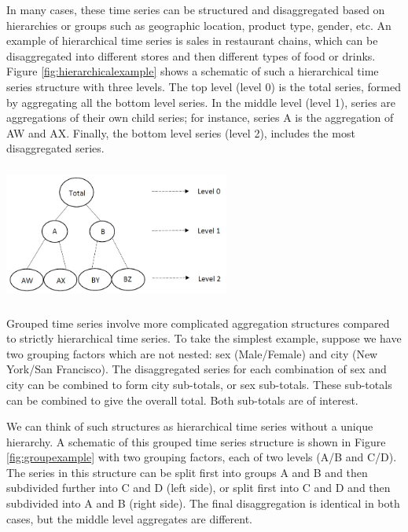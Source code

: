 \documentclass[11pt,a4paper,]{article}
\let\origfigure\figure
\let\endorigfigure\endfigure
\renewenvironment{figure}[1][2] {
    \expandafter\origfigure\expandafter[!htbp]
} {
    \endorigfigure
}
\begin{document}
In many cases, these time series can be structured and disaggregated
based on hierarchies or groups such as geographic location, product
type, gender, etc. An example of hierarchical time series is sales in
restaurant chains, which can be disaggregated into different stores and
then different types of food or drinks. Figure
\ref{fig:hierarchicalexample} shows a schematic of such a hierarchical
time series structure with three levels. The top level (level 0) is the
total series, formed by aggregating all the bottom level series. In the
middle level (level 1), series are aggregations of their own child
series; for instance, series A is the aggregation of AW and AX. Finally,
the bottom level series (level 2), includes the most disaggregated
series.

\begin{figure}

{\centering \includegraphics[width=280px,height=170px]{Paper-Figures/hierarchical_example} 

}

\caption{An example of a two level hierarchical structure.}\label{fig:hierarchicalexample}
\end{figure}

Grouped time series involve more complicated aggregation structures
compared to strictly hierarchical time series. To take the simplest
example, suppose we have two grouping factors which are not nested: sex
(Male/Female) and city (New York/San Francisco). The disaggregated
series for each combination of sex and city can be combined to form city
sub-totals, or sex sub-totals. These sub-totals can be combined to give
the overall total. Both sub-totals are of interest.

We can think of such structures as hierarchical time series without a
unique hierarchy. A schematic of this grouped time series structure is
shown in Figure \ref{fig:groupexample} with two grouping factors, each
of two levels (A/B and C/D). The series in this structure can be split
first into groups A and B and then subdivided further into C and D (left
side), or split first into C and D and then subdivided into A and B
(right side). The final disaggregation is identical in both cases, but
the middle level aggregates are different.
\end{document}
